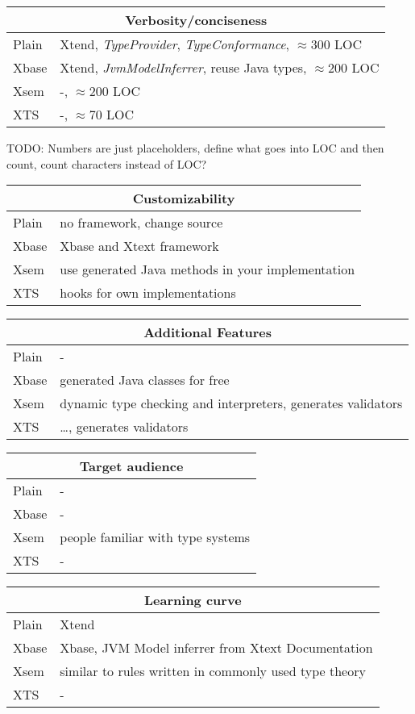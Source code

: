 \begin{frame}
\begin{tabularx}{\linewidth}{ l   X }
\multicolumn{2}{c}{Verbosity/conciseness} \\ \hline
Plain & Xtend, \emph{TypeProvider}, \emph{TypeConformance}, $\approx$300 LOC\\
Xbase & Xtend, \emph{JvmModelInferrer}, reuse Java types, $\approx$200 LOC  \\
Xsem &  -, $\approx$200 LOC \\
XTS & -, $\approx$70 LOC\\
\end{tabularx}

TODO: Numbers are just placeholders, define what goes into LOC and then count,
count characters instead of LOC?

\begin{tabularx}{\linewidth}{ l   X }
\multicolumn{2}{c}{Customizability} \\ \hline
Plain & no framework, change source \\
Xbase & Xbase and Xtext framework \\
Xsem & use generated Java methods in your implementation \\
XTS & hooks for own implementations \\
\end{tabularx}

\begin{tabularx}{\linewidth}{ l   X }
\multicolumn{2}{c}{Additional Features} \\ \hline
Plain & - \\
Xbase & generated Java classes for free \\
Xsem & dynamic type checking and interpreters, generates validators \\
XTS & \ldots, generates validators \\
\end{tabularx}

\begin{tabularx}{\linewidth}{ l   X }
\multicolumn{2}{c}{Target audience} \\ \hline
Plain & - \\
Xbase & - \\
Xsem & people familiar with type systems \\
XTS & - \\
\end{tabularx}

\begin{tabularx}{\linewidth}{ l   X }
\multicolumn{2}{c}{Learning curve} \\ \hline
Plain & Xtend \\
Xbase & Xbase, JVM Model inferrer from Xtext Documentation \\
Xsem & similar to rules written in commonly used type theory \\
XTS & - \\
\end{tabularx}


\end{frame}
